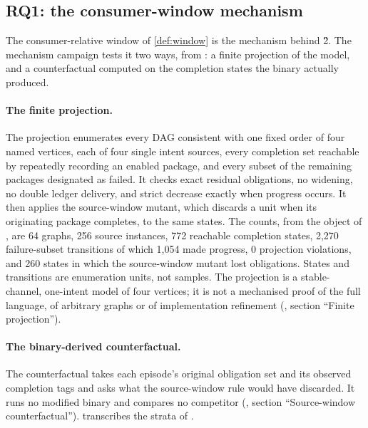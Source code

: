 \subsection{RQ1: the consumer-window mechanism}
\label{sec:eval:rq1}

The consumer-relative window of \cref{def:window} is the mechanism behind
\G{2}. The mechanism campaign tests it two ways, from
: a
finite projection of the model, and a counterfactual computed on the
completion states the binary actually produced.

\paragraph{The finite projection.}
The projection enumerates every DAG consistent with one fixed order of four
named vertices, each of four single intent sources, every completion set
reachable by repeatedly recording an enabled package, and every subset of the
remaining packages designated as failed. It checks exact residual obligations,
no widening, no double ledger delivery, and strict decrease exactly when
progress occurs. It then applies the source-window mutant, which discards a
unit when its originating package completes, to the same states. The counts,
from the  object of
, are
64 graphs, 256 source instances, 772 reachable completion states, 2,270
failure-subset transitions of which 1,054 made progress, 0 projection
violations, and 260 states in which the source-window mutant lost obligations.
States and transitions are enumeration units, not samples. The projection is a
stable-channel, one-intent model of four vertices; it is not a mechanised proof
of the full language, of arbitrary graphs or of implementation refinement
(, section ``Finite projection'').

\paragraph{The binary-derived counterfactual.}
The counterfactual takes each episode's original obligation set and its
observed completion tags and asks what the source-window rule would have
discarded. It runs no modified binary and compares no competitor
(, section ``Source-window counterfactual'').
 transcribes the strata of .

